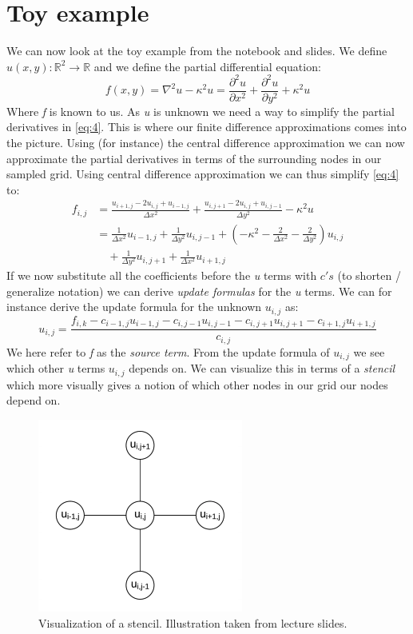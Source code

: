 \section{Toy example}
We can now look at the toy example from the notebook and slides. We define $u(x,y): \mathbb{R}^2 \rightarrow \mathbb{R}$ and we define the partial differential equation:
\begin{equation}
	f(x,y) = \nabla^2 u - \kappa^2 u = \frac{\partial^2 u}{\partial x^2} + \frac{\partial^2 u}{\partial y^2} + \kappa^2 u \label{eq:4}
\end{equation}
Where \textit{f} is known to us. As \textit{u} is unknown we need a way to simplify the partial derivatives in \autoref{eq:4}. This is where our finite difference approximations comes into the picture. Using (for instance) the central difference approximation we can now approximate the partial derivatives in terms of the surrounding nodes in our sampled grid. Using central difference approximation we can thus simplify \autoref{eq:4} to:
\begin{align*}
	f_{i,j} &= \frac{u_{i+1,j} - 2u_{i,j} + u_{i-1,j}}{\Delta x^2} + \frac{u_{i,j+1} - 2u_{i,j} + u_{i,j-1}}{\Delta y^2} - \kappa^2 u\\
	&= \frac{1}{\Delta x^2}u_{i-1,j} + \frac{1}{\Delta y^2}u_{i,j-1} + \left(-\kappa^2 - \frac{2}{\Delta x^2} - \frac{2}{\Delta y^2}\right)u_{i,j} \\
	&\quad + \frac{1}{\Delta y^2}u_{i,j+1} + \frac{1}{\Delta x^2}u_{i+1,j}
\end{align*}
If we now substitute all the coefficients before the \textit{u} terms with $c's$ (to shorten / generalize notation) we can derive \textit{update formulas} for the \textit{u} terms. We can for instance derive the update formula for the unknown $u_{i,j}$ as:
\begin{equation*}
	u_{i,j} = \frac{f_{i,k} - c_{i-1,j}u_{i-1,j} - c_{i,j-1}u_{i,j-1} - c_{i,j+1}u_{i,j+1} - c_{i+1,j}u_{i+1,j}}{c_{i,j}}
\end{equation*}
We here refer to \textit{f} as the \textit{source term}. From the update formula of $u_{i,j}$ we see which other \textit{u} terms $u_{i,j}$ depends on. We can visualize this in terms of a \textit{stencil} which more visually gives a notion of which other nodes in our grid our nodes depend on.
\begin{figure}[H]
	\centering
	\includegraphics[width=0.4\linewidth]{Materials/stencil}
	\caption{Visualization of a stencil. Illustration taken from lecture slides.}
	\label{stencil}
\end{figure}
